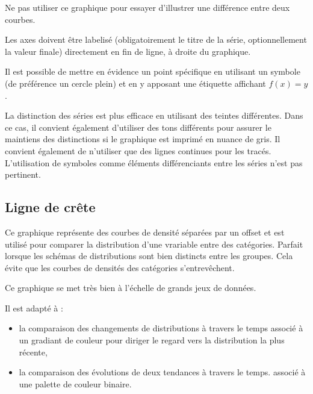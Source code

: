 \documentclass[a4paper,12pt]{article}
\begin{document}
\begin{multicols}{2}
Ne pas utiliser ce graphique pour essayer d'illustrer une différence entre deux courbes. \autocite{jonathanschwabishTime2021}

Les axes doivent être labelisé (obligatoirement le titre de la série, optionnellement la valeur finale) directement en fin de ligne, à droite du graphique. \autocite{andreaskrauseBestPracticesData2024,sosulskiGraphics2019}

Il est possible de mettre en évidence un point spécifique en utilisant un symbole (de préférence un cercle plein) et en y apposant une étiquette affichant \(f(x)=y\).

La distinction des séries est plus efficace en utilisant des teintes différentes. Dans ce cas, il convient également d'utiliser des tons différents pour assurer le maintiens des distinctions si le graphique est imprimé en nuance de gris. \autocite{stephenfewComponentlevelGraphDesign2012}
Il convient également de n'utiliser que des lignes continues pour les tracés. \autocite{stephenfewComponentlevelGraphDesign2012}
L'utilisation de symboles comme éléments différenciants entre les séries n'est pas pertinent. \autocite{stephenfewComponentlevelGraphDesign2012}
\subsection*{Ligne de crête}
\label{sec:org3400381}
Ce graphique représente des courbes de densité séparées par un offset et est utilisé pour comparer la distribution d'une vrariable entre des catégories. \autocite{wilkeVisualizingManyDistributions2019} Parfait lorsque les schémas de distributions sont bien distincts entre les groupes. \autocite{mikeyiHowChooseRight2020} Cela évite que les courbes de densités des catégories s'entrevêchent.\autocite{jonathanschwabishDistribution2021}

Ce graphique se met très bien à l'échelle de grands jeux de données. \autocite{wilkeVisualizingManyDistributions2019}

Il est adapté à :
\begin{itemize}
\item la comparaison des changements de distributions à travers le temps \autocite{wilkeDirectoryVisualizations2019} associé à un gradiant de couleur pour diriger le regard vers la distribution la plus récente, \autocite{jonathanschwabishDistribution2021}
\item la comparaison des évolutions de deux tendances à travers le temps. \autocite{wilkeVisualizingManyDistributions2019} associé à une palette de couleur binaire.
\end{itemize}


\end{multicols}
\end{document}
